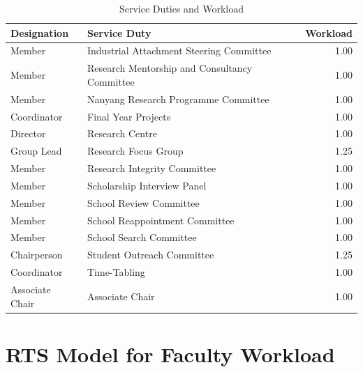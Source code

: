 \begin{table}[htpb]
      \centering
      \begin{tabular}{|l | l | r |}
            \hline
            Designation     & Service Duty                                  & Workload \\
            \hline
            Member          & Industrial Attachment Steering Committee      & 1.00     \\
            Member          & Research Mentorship and Consultancy Committee & 1.00     \\
            Member          & Nanyang Research Programme Committee          & 1.00     \\
            Coordinator     & Final Year Projects                           & 1.00     \\
            Director        & Research Centre                               & 1.00     \\
            Group Lead      & Research Focus Group                          & 1.25     \\
            Member          & Research Integrity Committee                  & 1.00     \\
            Member          & Scholarship Interview Panel                   & 1.00     \\
            Member          & School Review Committee                       & 1.00     \\
            Member          & School Reappointment Committee                & 1.00     \\
            Member          & School Search Committee                       & 1.00     \\
            Chairperson     & Student Outreach Committee                    & 1.25     \\
            Coordinator     & Time-Tabling                                  & 1.00     \\
            Associate Chair & Associate Chair                               & 1.00     \\
            \hline
      \end{tabular}
      \caption{Service Duties and Workload}
      \label{tab:service_duties}
\end{table}

\section{RTS Model for Faculty Workload}

